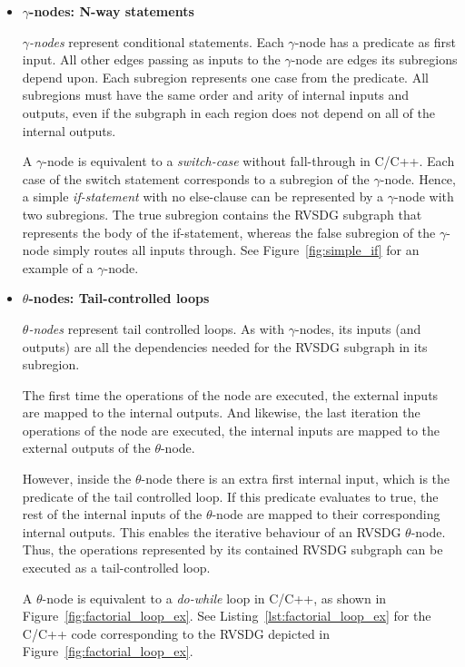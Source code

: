 \begin{itemize}

\item \textbf{$\gamma$-nodes: N-way statements}

\textit{$\gamma$-nodes} represent conditional statements. Each $\gamma$-node has
a predicate as first input. All other edges passing as inputs to the
$\gamma$-node are edges its subregions depend upon. Each subregion represents
one case from the predicate. All subregions must have the same order and arity
of internal inputs and outputs, even if the subgraph in each region does not
depend on all of the internal outputs.

A $\gamma$-node is equivalent to a \textit{switch-case} without fall-through in
C/C++. Each case of the switch statement corresponds to a subregion of the
$\gamma$-node. Hence, a simple \textit{if-statement} with no else-clause can be
represented by a $\gamma$-node with two subregions. The true subregion contains
the RVSDG subgraph that represents the body of the if-statement, whereas the
false subregion of the $\gamma$-node simply routes all inputs through. See
Figure~\ref{fig:simple_if} for an example of a $\gamma$-node.

\item \textbf{$\theta$-nodes: Tail-controlled loops}

\textit{$\theta$-nodes} represent tail controlled loops. As with
$\gamma$-nodes, its inputs (and outputs) are all the dependencies needed for the
RVSDG subgraph in its subregion.

The first time the operations of the node are executed, the external inputs are
mapped to the internal outputs. And likewise, the last iteration the operations
of the node are executed, the internal inputs are mapped to the external outputs
of the $\theta$-node.

However, inside the $\theta$-node there is an extra first internal input, which
is the predicate of the tail controlled loop. If this predicate evaluates to
true, the rest of the internal inputs of the $\theta$-node are mapped to their
corresponding internal outputs. This enables the iterative behaviour of an RVSDG
$\theta$-node. Thus, the operations represented by its contained RVSDG subgraph
can be executed as a tail-controlled loop.

A $\theta$-node is equivalent to a \textit{do-while} loop in C/C++, as shown in
Figure~\ref{fig:factorial_loop_ex}. See Listing~\ref{lst:factorial_loop_ex} for
the C/C++ code corresponding to the RVSDG depicted in
Figure~\ref{fig:factorial_loop_ex}.


\end{itemize}
